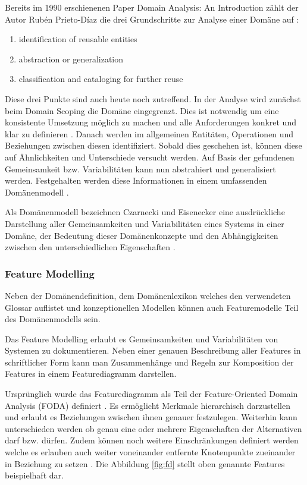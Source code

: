 \documentclass[12pt,oneside,a4paper,parskip]{scrbook}
\begin{document}
Bereits im 1990 erschienenen Paper Domain Analysis: An Introduction zählt der Autor Rubén Prieto-Díaz die drei Grundschritte zur Analyse einer Domäne auf \cite{prieto1990}:

\begin{enumerate}[itemsep=-10pt]
	\item identification of reusable entities 
	\item abstraction or generalization 
	\item classification and cataloging for further reuse
\end{enumerate}

Diese drei Punkte sind auch heute noch zutreffend. In der Analyse wird zunächst beim Domain Scoping die Domäne eingegrenzt. Dies ist notwendig um eine konsistente Umsetzung möglich zu machen und alle Anforderungen konkret und klar zu definieren \cite[S. 239]{stahl2007}. Danach werden im allgemeinen Entitäten, Operationen und Beziehungen zwischen diesen identifiziert. Sobald dies geschehen ist, können diese auf Ähnlichkeiten und Unterschiede versucht werden. Auf Basis der gefundenen Gemeinsamkeit bzw. Variabilitäten kann nun abstrahiert und generalisiert werden. Festgehalten werden diese Informationen in einem umfassenden Domänenmodell \cite[S. 24ff.]{czaeis2000}.

Als Domänenmodell bezeichnen Czarnecki und Eisenecker eine ausdrückliche Darstellung aller Gemeinsamkeiten und Variabilitäten eines Systems in einer Domäne, der Bedeutung dieser Domänenkonzepte und den Abhängigkeiten zwischen den unterschiedlichen Eigenschaften \cite[S. 23f.]{czaeis2000}.

\subsubsection{Feature Modelling}

Neben der Domänendefinition, dem Domänenlexikon welches den verwendeten Glossar auflistet und konzeptionellen Modellen können auch Featuremodelle Teil des Domänenmodells sein. 

Das Feature Modelling erlaubt es Gemeinsamkeiten und Variabilitäten von Systemen zu dokumentieren. Neben einer genauen Beschreibung aller Features in schriftlicher Form kann man Zusammenhänge und Regeln zur Komposition der Features in einem Featurediagramm darstellen.

Ursprünglich wurde das Featurediagramm als Teil der Feature-Oriented Domain Analysis (FODA) definiert \cite{kang1990}. Es ermöglicht Merkmale hierarchisch darzustellen und erlaubt es Beziehungen zwischen ihnen genauer festzulegen. Weiterhin kann unterschieden werden ob genau eine oder mehrere Eigenschaften der Alternativen darf bzw. dürfen. Zudem können noch weitere Einschränkungen definiert werden welche es erlauben auch weiter voneinander entfernte Knotenpunkte zueinander in Beziehung zu setzen \cite[S. 240f.]{stahl2007}. Die Abbildung \ref{fig:fd} stellt oben genannte Features beispielhaft dar.
\end{document}
